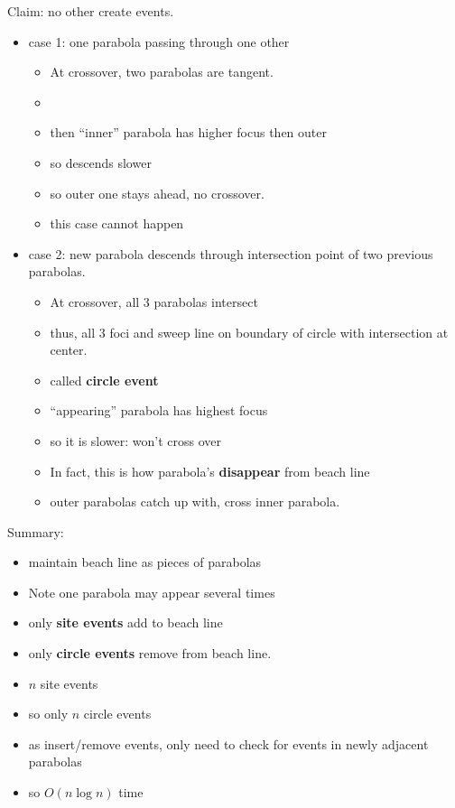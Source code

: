 \documentclass{article}
\begin{document}
Claim: no other create events.
\begin{itemize}
\item case 1: one parabola passing through one other
\begin{itemize}
\item At crossover, two parabolas are tangent.
\item 
\item then ``inner'' parabola has higher focus then outer
\item so descends slower
\item so outer one stays ahead, no crossover.
\item this case cannot happen
\end{itemize}
\item case 2: new parabola descends through intersection point of two
  previous parabolas.
\begin{itemize}
\item At crossover, all 3 parabolas intersect
\item thus, all 3 foci and sweep line on boundary of circle with
  intersection at center.
\item called \textbf{ circle event}
\item ``appearing'' parabola has highest focus
\item so it is slower: won't cross over
\item In fact, this is how parabola's \textbf{ disappear} from beach line
\item outer parabolas catch up with, cross inner parabola.
\end{itemize}
\end{itemize}

Summary:
\begin{itemize}
\item maintain beach line as pieces of parabolas
\item Note one parabola may appear several times
\item only \textbf{ site events} add to beach line
\item only \textbf{ circle events} remove from beach line.
\item $n$ site events
\item so only $n$ circle events
\item as insert/remove events, only need to check for events in newly
  adjacent parabolas
\item so $O(n\log n)$ time
\end{itemize}
\end{document}
